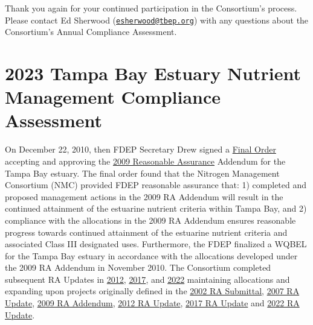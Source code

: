 \documentclass[
  letterpaper,
  DIV=11,
  numbers=noendperiod]{scrreport}
\begin{document}
Thank you again for your continued participation in the Consortium's
process. Please contact Ed Sherwood
(\href{mailto:esherwood@tbep.org}{\nolinkurl{esherwood@tbep.org}}) with
any questions about the Consortium's Annual Compliance Assessment.


\chapter{2023 Tampa Bay Estuary Nutrient Management Compliance
Assessment}\label{tampa-bay-estuary-nutrient-management-compliance-assessment}

On December 22, 2010, then FDEP Secretary Drew signed a
\href{https://drive.google.com/file/d/1wV3w8ack_fLNK3yS-xTR7LTmziNtZ8CN/view?usp=share_link}{Final
Order} accepting and approving the
\href{https://drive.google.com/file/d/10IjJAfcGFf007a5VdPXAUtUi4dx-cmsA/view?usp=drivesdk}{2009
Reasonable Assurance} Addendum for the Tampa Bay estuary. The final
order found that the Nitrogen Management Consortium (NMC) provided FDEP
reasonable assurance that: 1) completed and proposed management actions
in the 2009 RA Addendum will result in the continued attainment of the
estuarine nutrient criteria within Tampa Bay, and 2) compliance with the
allocations in the 2009 RA Addendum ensures reasonable progress towards
continued attainment of the estuarine nutrient criteria and associated
Class III designated uses. Furthermore, the FDEP finalized a WQBEL for
the Tampa Bay estuary in accordance with the allocations developed under
the 2009 RA Addendum in November 2010. The Consortium completed
subsequent RA Updates in
\href{https://tbep.org/reasonable-assurance-plans-updates-2012/}{2012},
\href{https://tbep.org/reasonable-assurance-plans-updates-2017/}{2017},
and
\href{https://drive.google.com/file/d/18HHMx4U6vHNrFyepEFuoTJ_sEKyTA_gu/view?usp=share_link}{2022}
maintaining allocations and expanding upon projects originally defined
in the
\href{https://tbep.org/reasonable-assurance-plans-updates-2002/}{2002 RA
Submittal},
\href{https://tbep.org/reasonable-assurance-plans-updates-2007/}{2007 RA
Update},
\href{https://drive.google.com/file/d/10IjJAfcGFf007a5VdPXAUtUi4dx-cmsA/view?usp=drivesdk}{2009
RA Addendum},
\href{https://drive.google.com/file/d/1F_QmQcvGVQ78wK3jcMLMGmjs1vJ21nto/view?usp=share_link}{2012
RA Update},
\href{https://drive.google.com/file/d/1VdYE67_aZAhFq6JYQSKxx2WY2O5KwyUI/view?usp=share_link}{2017
RA Update} and
\href{https://drive.google.com/file/d/18HHMx4U6vHNrFyepEFuoTJ_sEKyTA_gu/view?usp=share_link}{2022
RA Update}.
\end{document}
